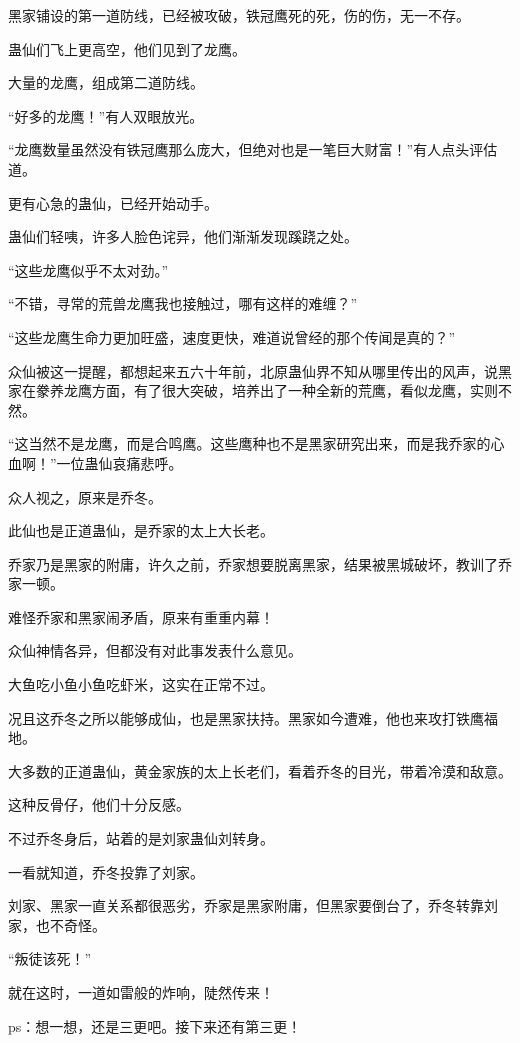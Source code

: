 \begin{this_body}
黑家铺设的第一道防线，已经被攻破，铁冠鹰死的死，伤的伤，无一不存。

蛊仙们飞上更高空，他们见到了龙鹰。

大量的龙鹰，组成第二道防线。

“好多的龙鹰！”有人双眼放光。

“龙鹰数量虽然没有铁冠鹰那么庞大，但绝对也是一笔巨大财富！”有人点头评估道。

更有心急的蛊仙，已经开始动手。

蛊仙们轻咦，许多人脸色诧异，他们渐渐发现蹊跷之处。

“这些龙鹰似乎不太对劲。”

“不错，寻常的荒兽龙鹰我也接触过，哪有这样的难缠？”

“这些龙鹰生命力更加旺盛，速度更快，难道说曾经的那个传闻是真的？”

众仙被这一提醒，都想起来五六十年前，北原蛊仙界不知从哪里传出的风声，说黑家在豢养龙鹰方面，有了很大突破，培养出了一种全新的荒鹰，看似龙鹰，实则不然。

“这当然不是龙鹰，而是合鸣鹰。这些鹰种也不是黑家研究出来，而是我乔家的心血啊！”一位蛊仙哀痛悲呼。

众人视之，原来是乔冬。

此仙也是正道蛊仙，是乔家的太上大长老。

乔家乃是黑家的附庸，许久之前，乔家想要脱离黑家，结果被黑城破坏，教训了乔家一顿。

难怪乔家和黑家闹矛盾，原来有重重内幕！

众仙神情各异，但都没有对此事发表什么意见。

大鱼吃小鱼小鱼吃虾米，这实在正常不过。

况且这乔冬之所以能够成仙，也是黑家扶持。黑家如今遭难，他也来攻打铁鹰福地。

大多数的正道蛊仙，黄金家族的太上长老们，看着乔冬的目光，带着冷漠和敌意。

这种反骨仔，他们十分反感。

不过乔冬身后，站着的是刘家蛊仙刘转身。

一看就知道，乔冬投靠了刘家。

刘家、黑家一直关系都很恶劣，乔家是黑家附庸，但黑家要倒台了，乔冬转靠刘家，也不奇怪。

“叛徒该死！”

就在这时，一道如雷般的炸响，陡然传来！

ps：想一想，还是三更吧。接下来还有第三更！

\end{this_body}

